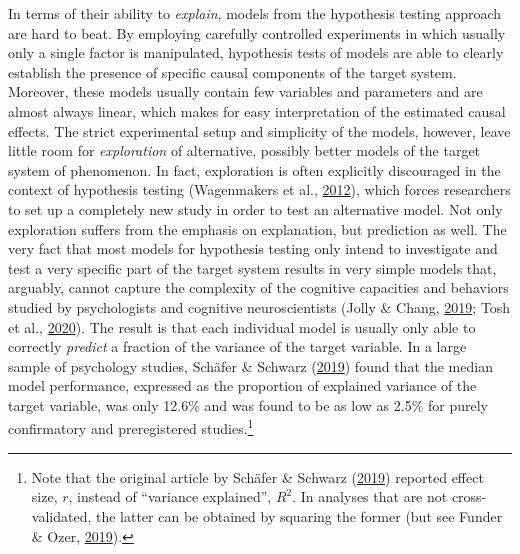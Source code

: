 \documentclass[12pt,american,a4paper,oneside,]{memoir} %
\let\rmarkdownfootnote\footnote%
\def\footnote{\protect\rmarkdownfootnote}
\begin{document}
In terms of their ability to \emph{explain}, models from the hypothesis testing approach are hard to beat. By employing carefully controlled experiments in which usually only a single factor is manipulated, hypothesis tests of models are able to clearly establish the presence of specific causal components of the target system. Moreover, these models usually contain few variables and parameters and are almost always linear, which makes for easy interpretation of the estimated causal effects. The strict experimental setup and simplicity of the models, however, leave little room for \emph{exploration} of alternative, possibly better models of the target system of phenomenon. In fact, exploration is often explicitly discouraged in the context of hypothesis testing (Wagenmakers et al., \protect\hyperlink{ref-Wagenmakers2012-vd}{2012}), which forces researchers to set up a completely new study in order to test an alternative model. Not only exploration suffers from the emphasis on explanation, but prediction as well. The very fact that most models for hypothesis testing only intend to investigate and test a very specific part of the target system results in very simple models that, arguably, cannot capture the complexity of the cognitive capacities and behaviors studied by psychologists and cognitive neuroscientists (Jolly \& Chang, \protect\hyperlink{ref-Jolly2019-lx}{2019}; Tosh et al., \protect\hyperlink{ref-Tosh2020-sf}{2020}). The result is that each individual model is usually only able to correctly \emph{predict} a fraction of the variance of the target variable. In a large sample of psychology studies, Schäfer \& Schwarz (\protect\hyperlink{ref-Schafer2019-ue}{2019}) found that the median model performance, expressed as the proportion of explained variance of the target variable, was only 12.6\% and was found to be as low as 2.5\% for purely confirmatory and preregistered studies.\footnote{Note that the original article by Schäfer \& Schwarz (\protect\hyperlink{ref-Schafer2019-ue}{2019}) reported effect size, \(r\), instead of ``variance explained'', \(R^{2}\). In analyses that are not cross-validated, the latter can be obtained by squaring the former (but see Funder \& Ozer, \protect\hyperlink{ref-Funder2019-ow}{2019}).}
\end{document}
